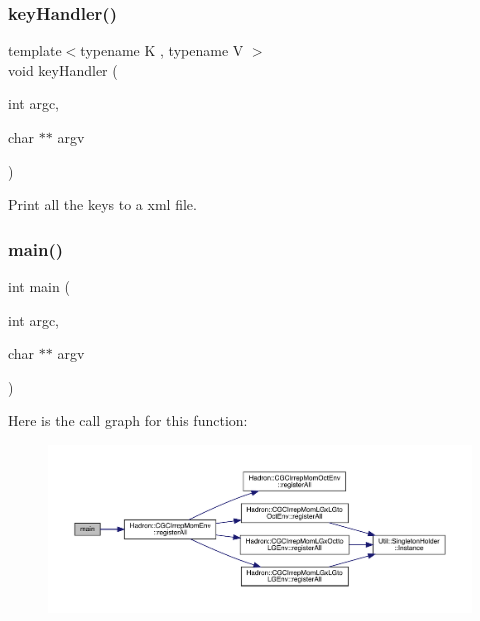 \subsubsection{\texorpdfstring{keyHandler()}{keyHandler()}}
{\footnotesize\ttfamily template$<$typename K , typename V $>$ \\
void key\+Handler (\begin{DoxyParamCaption}\item[{int}]{argc,  }\item[{char $\ast$$\ast$}]{argv }\end{DoxyParamCaption})}



Print all the keys to a xml file. 

\mbox{\label{adat-devel_2main_2dbutil_2dbdisco_8cc_a3c04138a5bfe5d72780bb7e82a18e627}} 
\subsubsection{\texorpdfstring{main()}{main()}}
{\footnotesize\ttfamily int main (\begin{DoxyParamCaption}\item[{int}]{argc,  }\item[{char $\ast$$\ast$}]{argv }\end{DoxyParamCaption})}

Here is the call graph for this function\+:
\nopagebreak
\begin{figure}[H]
\begin{center}
\leavevmode
\includegraphics[width=350pt]{db/d54/adat-devel_2main_2dbutil_2dbdisco_8cc_a3c04138a5bfe5d72780bb7e82a18e627_cgraph}
\end{center}
\end{figure}
\mbox{\label{adat-devel_2main_2dbutil_2dbdisco_8cc_a05c6483ffb9fa71112b451a5dd7eb935}} 
